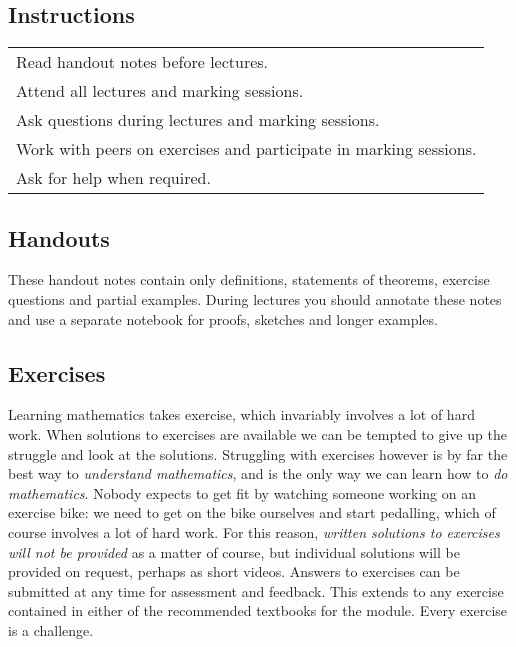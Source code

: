 \subsection*{Instructions}
\begin{tabular}{l} 
Read handout notes before lectures. \\
Attend all lectures and marking sessions. \\
Ask questions during lectures and marking sessions. \\
Work with peers on exercises and participate in marking sessions. \\
Ask for help when required. \\ 
\end{tabular}

\subsection*{Handouts}
These handout notes contain only definitions, statements of theorems, exercise questions and partial examples. 
During lectures you should annotate these notes and use a separate notebook for proofs, sketches and longer examples.

\bigskip
{}
\subsection*{Exercises}
Learning mathematics takes exercise, which invariably involves a lot of hard work. When solutions to exercises are available we can be tempted to give up the struggle and look at the solutions. Struggling with exercises however is by far the best way to \emph{understand mathematics}, and is the only way we can learn how to \emph{do mathematics}. Nobody expects to get fit by watching someone working on an exercise bike: we need to get on the bike ourselves and start pedalling, which of course involves a lot of hard work. For this reason, \emph{written solutions to exercises will not be provided} as a matter of course, but individual solutions will be provided on request, perhaps as short videos. Answers to exercises can be submitted at any time for assessment and feedback. This extends to any exercise contained in either of the recommended textbooks for the module. Every exercise is a challenge.

